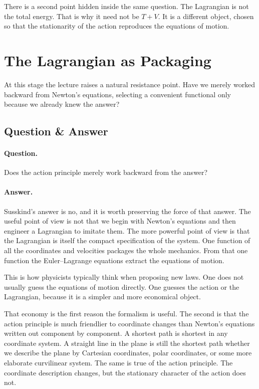 There is a second point hidden inside the same question. The Lagrangian is not the total energy. That is why it need not be \(T+V\). It is a different object, chosen so that the stationarity of the action reproduces the equations of motion.

\section{The Lagrangian as Packaging}

At this stage the lecture raises a natural resistance point. Have we merely worked backward from Newton's equations, selecting a convenient functional only because we already knew the answer?

\subsection{Question \& Answer}

\paragraph{Question.} Does the action principle merely work backward from the answer?

\paragraph{Answer.} Susskind's answer is no, and it is worth preserving the force of that answer. The useful point of view is not that we begin with Newton's equations and then engineer a Lagrangian to imitate them. The more powerful point of view is that the Lagrangian is itself the compact specification of the system. One function of all the coordinates and velocities packages the whole mechanics. From that one function the Euler--Lagrange equations extract the equations of motion.

This is how physicists typically think when proposing new laws. One does not usually guess the equations of motion directly. One guesses the action or the Lagrangian, because it is a simpler and more economical object.

That economy is the first reason the formalism is useful. The second is that the action principle is much friendlier to coordinate changes than Newton's equations written out component by component. A shortest path is shortest in any coordinate system. A straight line in the plane is still the shortest path whether we describe the plane by Cartesian coordinates, polar coordinates, or some more elaborate curvilinear system. The same is true of the action principle. The coordinate description changes, but the stationary character of the action does not.

